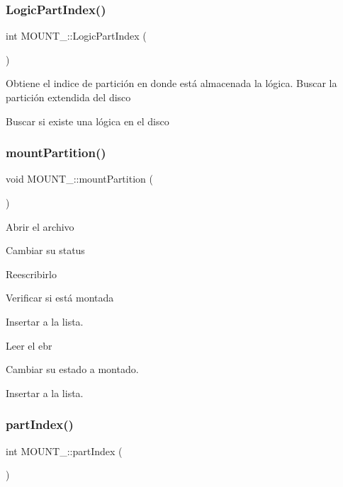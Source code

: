 \subsubsection{\texorpdfstring{Logic\+Part\+Index()}{LogicPartIndex()}}
{\footnotesize\ttfamily int M\+O\+U\+N\+T\+\_\+\+::\+Logic\+Part\+Index (\begin{DoxyParamCaption}{ }\end{DoxyParamCaption})}

Obtiene el indice de partición en donde está almacenada la lógica. Buscar la partición extendida del disco

Buscar si existe una lógica en el disco \mbox{\label{classMOUNT___a58750b67c92586b45a944d5eeb2f7645}} 
\subsubsection{\texorpdfstring{mount\+Partition()}{mountPartition()}}
{\footnotesize\ttfamily void M\+O\+U\+N\+T\+\_\+\+::mount\+Partition (\begin{DoxyParamCaption}{ }\end{DoxyParamCaption})}

Abrir el archivo

Cambiar su status

Reescribirlo

Verificar si está montada

Insertar a la lista.

Leer el ebr

Cambiar su estado a montado.

Insertar a la lista. \mbox{\label{classMOUNT___a3ff41f627cb6e3e573da1b627850e01a}} 
\subsubsection{\texorpdfstring{part\+Index()}{partIndex()}}
{\footnotesize\ttfamily int M\+O\+U\+N\+T\+\_\+\+::part\+Index (\begin{DoxyParamCaption}{ }\end{DoxyParamCaption})}

